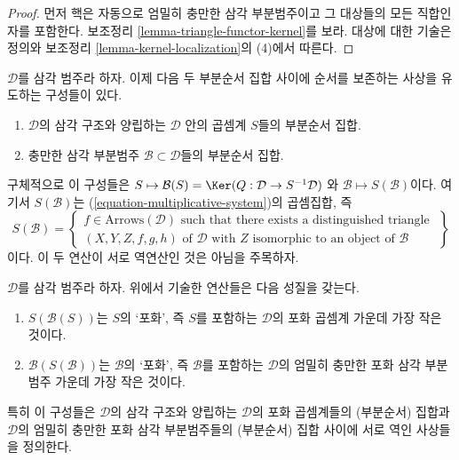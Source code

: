\begin{proof}
먼저 핵은 자동으로 엄밀히 충만한 삼각 부분범주이고 그 대상들의
모든 직합인자를 포함한다. 보조정리
\ref{lemma-triangle-functor-kernel}를 보라.
대상에 대한 기술은 정의와 보조정리
\ref{lemma-kernel-localization}의 (4)에서 따른다.
\end{proof}

\noindent
$\mathcal{D}$를 삼각 범주라 하자. 이제 다음 두 부분순서 집합 사이에
순서를 보존하는 사상을 유도하는 구성들이 있다.
\begin{enumerate}
\item $\mathcal{D}$의 삼각 구조와 양립하는 $\mathcal{D}$ 안의
곱셈계 $S$들의 부분순서 집합.
\item 충만한 삼각 부분범주 $\mathcal{B} \subset \mathcal{D}$들의
부분순서 집합.
\end{enumerate}
구체적으로 이 구성들은
$S \mapsto \mathcal{B}(S) = \Ker(Q : \mathcal{D} \to S^{-1}\mathcal{D})$
와 $\mathcal{B} \mapsto S(\mathcal{B})$이다. 여기서
$S(\mathcal{B})$는 (\ref{equation-multiplicative-system})의
곱셈집합, 즉
$$
S(\mathcal{B}) =
\left\{
\begin{matrix}
f \in \text{Arrows}(\mathcal{D})
\text{ such that there exists a distinguished triangle }\\
(X, Y, Z, f, g, h) \text{ of }\mathcal{D}\text{ with }
Z\text{ isomorphic to an object of }\mathcal{B}
\end{matrix}
\right\}
$$
이다. 이 두 연산이 서로 역연산인 것은 아님을 주목하자.

\begin{lemma}
\label{lemma-operations}
$\mathcal{D}$를 삼각 범주라 하자. 위에서 기술한 연산들은 다음 성질을
갖는다.
\begin{enumerate}
\item $S(\mathcal{B}(S))$는 $S$의 ‘포화’, 즉 $S$를 포함하는
$\mathcal{D}$의 포화 곱셈계 가운데 가장 작은 것이다.
\item $\mathcal{B}(S(\mathcal{B}))$는 $\mathcal{B}$의 ‘포화’, 즉
$\mathcal{B}$를 포함하는 $\mathcal{D}$의 엄밀히 충만한 포화 삼각
부분범주 가운데 가장 작은 것이다.
\end{enumerate}
특히 이 구성들은 $\mathcal{D}$의 삼각 구조와 양립하는
$\mathcal{D}$의 포화 곱셈계들의 (부분순서) 집합과
$\mathcal{D}$의 엄밀히 충만한 포화 삼각 부분범주들의 (부분순서)
집합 사이에 서로 역인 사상들을 정의한다.
\end{lemma}

